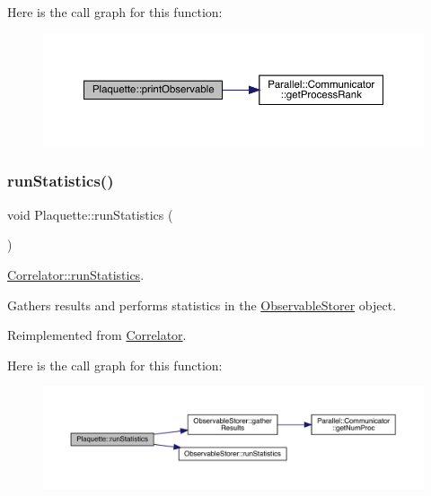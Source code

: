 Here is the call graph for this function\+:\nopagebreak
\begin{figure}[H]
\begin{center}
\leavevmode
\includegraphics[width=350pt]{class_plaquette_aa15bf42749c9fd995d4d572ca3ed4f22_cgraph}
\end{center}
\end{figure}
\mbox{\label{class_plaquette_aa54bf1807d9b192048026f94d585fa4f}} 
\subsubsection{\texorpdfstring{runStatistics()}{runStatistics()}}
{\footnotesize\ttfamily void Plaquette\+::run\+Statistics (\begin{DoxyParamCaption}{ }\end{DoxyParamCaption})\hspace{0.3cm}{\ttfamily [virtual]}}



\mbox{\hyperlink{class_correlator_a35197b1d12b62ef30b79c0138a26456e}{Correlator\+::run\+Statistics}}. 

Gathers results and performs statistics in the \mbox{\hyperlink{class_observable_storer}{Observable\+Storer}} object. 

Reimplemented from \mbox{\hyperlink{class_correlator_a35197b1d12b62ef30b79c0138a26456e}{Correlator}}.

Here is the call graph for this function\+:\nopagebreak
\begin{figure}[H]
\begin{center}
\leavevmode
\includegraphics[width=350pt]{class_plaquette_aa54bf1807d9b192048026f94d585fa4f_cgraph}
\end{center}
\end{figure}
\mbox{\label{class_plaquette_a011e1ca450fb40273ec8efa6d094c279}} 
